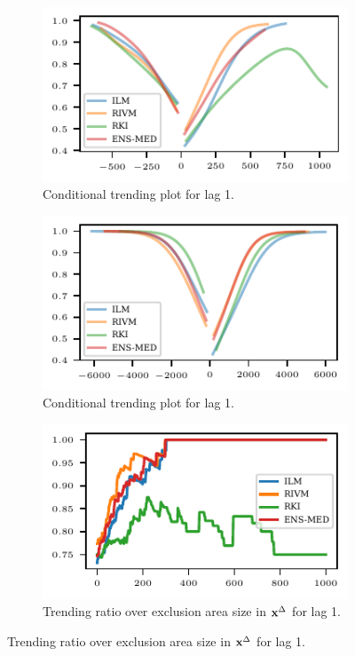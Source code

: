 \begin{figure}
    \centering
    \begin{subfigure}[t]{.48\textwidth}
    \includegraphics{plots/covid_nowcast/40_cond_prob_lag_1}
    \caption{Conditional trending plot for lag 1.}\label{fig:app-covid-cond-prob-1}
    \end{subfigure}\hfill
    \begin{subfigure}[t]{.48\textwidth}
    \includegraphics{plots/covid_nowcast/40_cond_prob_lag_14}
    \caption{Conditional trending plot for lag 1.}\label{fig:app-covid-cond-prob-14}
    \end{subfigure}
    \begin{subfigure}[t]{.48\textwidth}
    \includegraphics{plots/covid_nowcast/40_acc_eps_lag_1}
    \caption{Trending ratio over exclusion area size in $\mathbf{x}^{\Delta}$ for lag 1.}\label{fig:app-covid-trending-ratio-1}
    \end{subfigure}\hfill

\end{figure}
